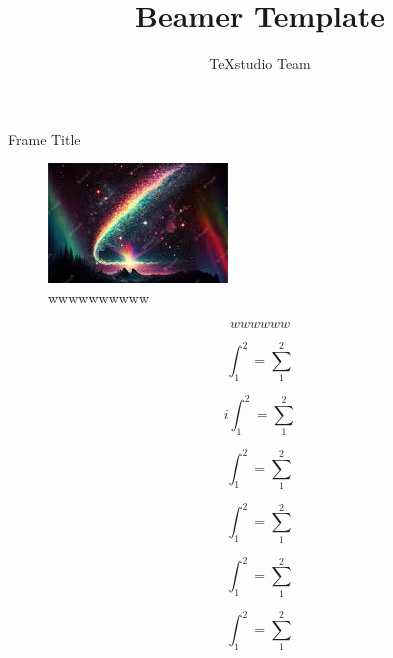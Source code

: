 \documentclass[professionalfont, aspectratio=169]{beamer}
\title{Beamer Template}
\author{TeXstudio Team}
\begin{document}
\begin{frame}[plain]
	\maketitle
\end{frame}
\begin{frame}{Frame Title}
	\begin{figure}[ht!]
		\centering
		\includegraphics{screenshot001}
		\caption{wwwwwwwwww}
		\label{fig:www}
	\end{figure}
	\begin{equation}
		wwwwww
		\label{www}
	\end{equation}
\end{frame}


\begin{frame}
	\begin{equation}\label{key}
		\int_{1}^{2}=\sum_{1}^{2}
	\end{equation}
\end{frame}
\begin{frame}
	\begin{equation}\label{key}
		i	\int_{1}^{2}=\sum_{1}^{2}
	\end{equation}
\end{frame}
\begin{frame}
	\begin{equation}\label{key}
		\int_{1}^{2}=\sum_{1}^{2}
	\end{equation}
\end{frame}
\begin{frame}
	\begin{equation}\label{key}
		\int_{1}^{2}=\sum_{1}^{2}
	\end{equation}
\end{frame}
\begin{frame}
	\begin{equation}\label{key}
		\int_{1}^{2}=\sum_{1}^{2}
	\end{equation}
\end{frame}
\begin{frame}
	\begin{equation}\label{key}
		\int_{1}^{2}=\sum_{1}^{2}
	\end{equation}
\end{frame}
\end{document}
